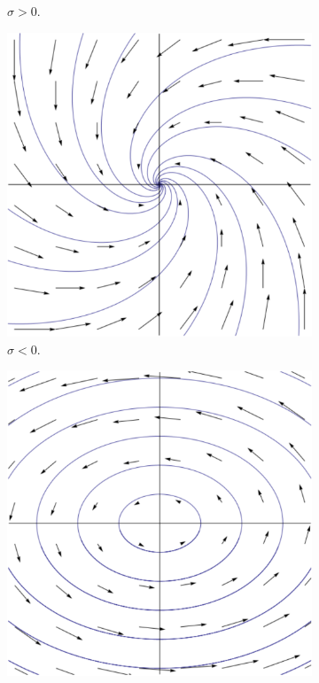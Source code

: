 \documentclass[../notes.tex]{subfiles}
\begin{document}
\begin{itemize}
\begin{figure}[h!]
\begin{subfigure}[b]{0.32\linewidth}
            \caption{$\sigma>0$.}
            \label{fig:planarComplexa}
        \end{subfigure}
        \begin{subfigure}[b]{0.32\linewidth}
            \centering
            \includegraphics[width=0.8\linewidth]{../ExtFiles/planarComplexb.png}
            \caption{$\sigma<0$.}
            \label{fig:planarComplexb}
        \end{subfigure}
        \begin{subfigure}[b]{0.32\linewidth}
            \centering
            \includegraphics[width=0.8\linewidth]{../ExtFiles/planarComplexc.png}

\end{subfigure}
\end{figure}
\end{itemize}
\end{document}
